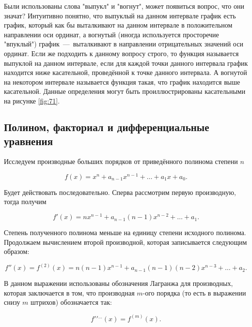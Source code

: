 \documentclass[12pt]{article}
\begin{document}
\par Были использованы слова "выпукл" и "вогнут", может появиться вопрос, что они значат? Интуитивно понятно, что выпуклый на данном интервале график есть график, который как бы выталкивают на данном интервале в положительном направлении оси ординат, а вогнутый (иногда используется просторечие "впуклый") график~\----~выталкивают в направлении отрицательных значений оси ординат. Если же подходить к данному вопросу строго, то функция называется выпуклой на данном интервале, если для каждой точки данного интервала график находится ниже касательной, проведённой к точке данного интервала. А вогнутой на некотором интервале называется функция такая, что график находится выше касательной. Данные определения могут быть проиллюстрированы касательными на рисунке \ref{fig:71}. 

\subsection{Полином, факториал и дифференциальные уравнения}
Исследуем производные больших порядков от приведённого полинома степени $n$

\begin{equation}
	f(x) = x^n + a_{n-1} x^{n-1} + \ldots + a_1 x + a_0.
\end{equation}

Будет действовать последовательно. Сперва рассмотрим первую производную, тогда получим

\begin{equation}
	f'(x) = nx^{n-1} + a_{n-1} (n-1) x^{n-2} + \ldots + a_1.
\end{equation}

Степень полученного полинома меньше на единицу степени исходного полинома. Продолжаем вычислением второй производной, которая записывается следующим образом:

\begin{equation}
	f''(x) = f^{(2)}(x) = n (n-1) x^{n-1} + a_{n-1} (n-1) (n-2) x^{n-3} + \ldots + a_2.
\end{equation}

В данном выражении использованы обозначения Лагранжа для производных, которая заключается в том, что производная $m$\--ого порядка (то есть в выражении снизу $m$ штрихов) обозначается так:

\begin{equation}
	f{}' {}' {}^{\ldots}(x) = f^{(m)}(x).
\end{equation}
\end{document}
